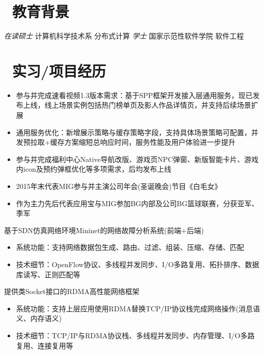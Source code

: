 \documentclass{resume}
\begin{document}
{\section{\faGraduationCap\  教育背景}
\normalsize
\textit{在读硕士} \quad 计算机科学技术系 \quad 分布式计算
\normalsize
\textit{学士} \quad 国家示范性软件学院 \quad 软件工程

\section{\faUsers\ 实习/项目经历}

\normalsize
{}
\begin{itemize}
  \item 参与并完成速看视频1.3版本需求：基于SPP框架开发接入层通用服务，现已发布上线，线上场景实例包括热门榜单页及影人作品详情页，并支持后续场景扩展
  \item 通用服务优化：新增展示策略与缓存策略字段，支持具体场景策略可配置，并发预拉取+缓存方案缩短总响应时间，服务性能及用户体验进一步提升
\end{itemize}

\normalsize
{}
\begin{itemize}
  \item 参与并完成福利中心Native导航改版、游戏页NPC弹窗、新版智能卡片、游戏内icon及预约弹框优化等多项需求，后均发布上线
  \item 2015年末代表MIG参与并主演公司年会(圣诞晚会)节目《白毛女》
  \item 作为主力先后代表应用宝与MIG参加BG内部及公司BG篮球联赛，分获亚军、季军
\end{itemize}

\normalsize
{}
基于SDN仿真网络环境Mininet的网络故障分析系统(前端+后端)
\begin{itemize}
  \item 系统功能：支持网络数据包生成、路由、过滤、组装、压缩、存储、匹配
  \item 技术细节：OpenFlow协议、多线程并发同步、I/O多路复用、拓扑排序、数据库读写、正则匹配等
\end{itemize}

\normalsize
{}
提供类Socket接口的RDMA高性能网络框架
\begin{itemize}
  \item 系统功能：支持上层应用使用RDMA替换TCP/IP协议栈完成网络操作(消息语义、内存语义)
  \item 技术细节：TCP/IP与RDMA协议栈、多线程并发同步、内存管理、I/O多路复用、连接复用等
\end{itemize}

}
\end{document}

